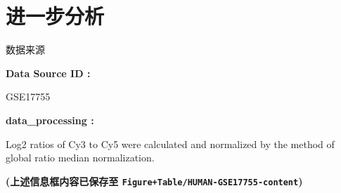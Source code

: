 \documentclass[
  ignorenonframetext,
]{beamer}
\begin{document}
\hypertarget{ux8fdbux4e00ux6b65ux5206ux6790}{%
\section{进一步分析}\label{ux8fdbux4e00ux6b65ux5206ux6790}}

\begin{frame}[fragile]{数据来源}
\protect\hypertarget{ux6570ux636eux6765ux6e90-1}{}
\begin{center}\begin{tcolorbox}[colback=gray!10, colframe=gray!50, width=0.9\linewidth, arc=1mm, boxrule=0.5pt]
\textbf{
Data Source ID
:}

\vspace{0.5em}

    GSE17755

\vspace{2em}


\textbf{
data\_processing
:}

\vspace{0.5em}

    Log2 ratios of Cy3 to Cy5 were calculated and
normalized by the method of global ratio median
normalization.

\vspace{2em}
\end{tcolorbox}
\end{center}

\textbf{(上述信息框内容已保存至
\texttt{Figure+Table/HUMAN-GSE17755-content})}
\end{frame}
\end{document}
